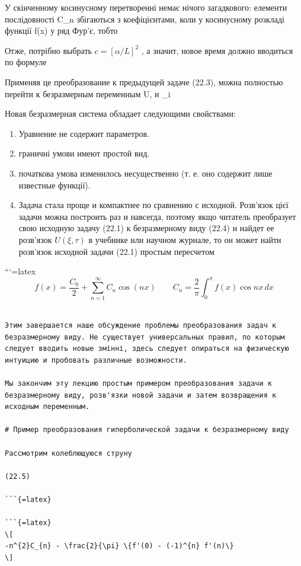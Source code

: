\documentclass[
  ukrainian,
]{article}
\begin{document}
У скінченному косинусному перетворенні немає нічого загадкового:
елементи послідовності C\_n збігаються з коефіцієнтами, коли 
у косинусному розкладі функції f(x) у ряд Фур'є, тобто

Отже, потрібно выбрать \(c = [\alpha/L]^2\) , а значит, новое время
должно вводиться по формуле

Применяя це преобразование к предыдущей задаче (22.3), можна полностью
перейти к безразмерным переменным U, \xi  и \tau\_i

Новая безразмерная система обладает следующими свойствами:

\begin{enumerate}
\def\labelenumi{\arabic{enumi}.}
\item
  Уравнение не содержит параметров.
\item
  граничні умови имеют простой вид.
\item
  початкова умова изменилось несущественно (т. е. оно содержит лише
  известные функції).
\item
  Задача стала проще и компактнее по сравнению с исходной. Розв'язок
  цієї задачи можна построить раз и навсегда, поэтому якщо читатель
  преобразует свою исходную задачу (22.1) к безразмерному виду (22.4) и
  найдет ее розв'язок \(U(\xi, \tau)\) в учебнике или научном журнале,
  то он может найти розв'язок исходной задачи (22.1) простым пересчетом
\end{enumerate}

```{=latex}
\[
f(x) = \frac{C_0}{2} + \sum_{n=1}^{\infty} C_n \cos(nx) \qquad C_n = \frac{2}{\pi} \int_{0}^{\pi} f(x) \cos nx \, dx
\]

\begin{verbatim}

Этим завершается наше обсуждение проблемы преобразования задач к безразмерному виду. Не существует универсальных правил, по которым следует вводить новые змінні, здесь следует опираться на физическую интуицию и пробовать различные возможности.

Мы закончим эту лекцию простым примером преобразования задачи к безразмерному виду, розв'язки новой задачи и затем возвращения к исходным переменным.

# Пример преобразования гиперболической задачи к безразмерному виду

Рассмотрим колеблющуюся струну

(22.5)

```{=latex}

```{=latex}
\[
-n^{2}C_{n} - \frac{2}{\pi} \{f'(0) - (-1)^{n} f'(n)\}
\]
\end{verbatim}
\end{document}
